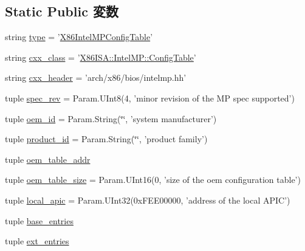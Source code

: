 \subsection*{Static Public 変数}
\begin{DoxyCompactItemize}
\item 
string \hyperlink{classIntelMP_1_1X86IntelMPConfigTable_acce15679d830831b0bbe8ebc2a60b2ca}{type} = '\hyperlink{classIntelMP_1_1X86IntelMPConfigTable}{X86IntelMPConfigTable}'
\item 
string \hyperlink{classIntelMP_1_1X86IntelMPConfigTable_a58cd55cd4023648e138237cfc0822ae3}{cxx\_\-class} = '\hyperlink{classX86ISA_1_1IntelMP_1_1ConfigTable}{X86ISA::IntelMP::ConfigTable}'
\item 
string \hyperlink{classIntelMP_1_1X86IntelMPConfigTable_a17da7064bc5c518791f0c891eff05fda}{cxx\_\-header} = 'arch/x86/bios/intelmp.hh'
\item 
tuple \hyperlink{classIntelMP_1_1X86IntelMPConfigTable_a524402a2c5b41fc09fdbe3ecc1c95abb}{spec\_\-rev} = Param.UInt8(4, 'minor revision of the MP spec supported')
\item 
tuple \hyperlink{classIntelMP_1_1X86IntelMPConfigTable_a92058ac009c691aede73e4bf13dbbb94}{oem\_\-id} = Param.String(\char`\"{}\char`\"{}, 'system manufacturer')
\item 
tuple \hyperlink{classIntelMP_1_1X86IntelMPConfigTable_a020c640aa066b041f10ab7eb9b2c146e}{product\_\-id} = Param.String(\char`\"{}\char`\"{}, 'product family')
\item 
tuple \hyperlink{classIntelMP_1_1X86IntelMPConfigTable_a6d9a21684fc320fcfbe4b209dbfb90af}{oem\_\-table\_\-addr}
\item 
tuple \hyperlink{classIntelMP_1_1X86IntelMPConfigTable_a29d3f23f1a8d13bdc245223bd853609f}{oem\_\-table\_\-size} = Param.UInt16(0, 'size of the oem configuration table')
\item 
tuple \hyperlink{classIntelMP_1_1X86IntelMPConfigTable_ae4cbc39fd3b7179305a8e5ec402511df}{local\_\-apic} = Param.UInt32(0xFEE00000, 'address of the local APIC')
\item 
tuple \hyperlink{classIntelMP_1_1X86IntelMPConfigTable_a605854af6244214f5ee998d69f168d79}{base\_\-entries}
\item 
tuple \hyperlink{classIntelMP_1_1X86IntelMPConfigTable_aef2ec381b2a36c10bceb7f9e6c443c8c}{ext\_\-entries}
\end{DoxyCompactItemize}


